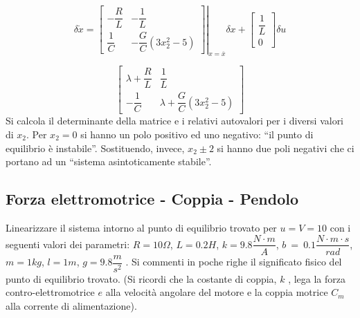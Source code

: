 \documentclass[a4paper]{report}
\begin{document}
\[
  \delta\dot{x} =
  \left .
  \begin{bmatrix}
    - \dfrac{R}{L} & - \dfrac{1}{L}\\ \dfrac{1}{C} & -
    \dfrac{G}{C}\left(3 x_2^2 - 5\right)
  \end{bmatrix}
  \right |_{x = \overline{x}} \delta x + \begin{bmatrix} \dfrac{1}{L}
    \\ 0 \end{bmatrix} \delta u
\]

\[
  \begin{bmatrix}
    \lambda + \dfrac{R}{L} & \dfrac{1}{L}\\
    - \dfrac{1}{C} & \lambda + \dfrac{G}{C}\left(3 x_2^2 - 5\right)
  \end{bmatrix}
\]
Si calcola il determinante della matrice e i relativi autovalori per i
diversi valori di $x_2$. Per $x_2 = 0$ si hanno un polo positivo ed
uno negativo: ``il punto di equilibrio \`e instabile''. Sostituendo,
invece, $x_2 \pm 2$ si hanno due poli negativi che ci portano ad un
``sistema asintoticamente stabile''.

\subsection{Forza elettromotrice - Coppia - Pendolo}
Linearizzare il sistema intorno al punto di equilibrio trovato per $u
= V = 10$ con i seguenti valori dei parametri: $R=10\Omega$, $L=0.2H$,
$k=9.8\dfrac{N \cdot m}{A}$, $b~=~0.1\dfrac{N \cdot m \cdot s}{rad}$,
$m=1kg$, $l=1m$, $g = 9.8\dfrac{m}{s^2}$ .
Si commenti in poche righe il significato fisico del punto di
equilibrio trovato. (Si ricordi che la costante di coppia, $k$ , lega
la forza contro-elettromotrice $e$ alla velocit\`a angolare del motore
e la coppia motrice $C_m$ alla corrente di alimentazione).
\end{document}
